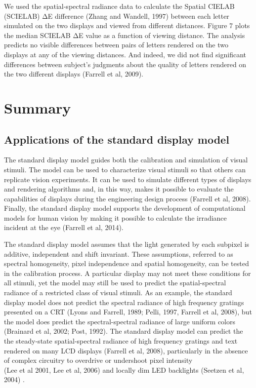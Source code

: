 \documentclass[
  letterpaper,
]{book}
\begin{document}
We used the spatial-spectral radiance data to calculate the Spatial
CIELAB (SCIELAB) ΔE difference (Zhang and Wandell, 1997) between each
letter simulated on the two displays and viewed from different
distances. Figure 7 plots the median SCIELAB ΔE value as a function of
viewing distance. The analysis predicts no visible differences between
pairs of letters rendered on the two displays at any of the viewing
distances. And indeed, we did not find significant differences between
subject's judgments about the quality of letters rendered on the two
different displays (Farrell et al, 2009).

\section{Summary}\label{summary}

\subsection{Applications of the standard display
model}\label{applications-of-the-standard-display-model}

The standard display model guides both the calibration and simulation of
visual stimuli. The model can be used to characterize visual stimuli so
that others can replicate vision experiments. It can be used to simulate
different types of displays and rendering algorithms and, in this way,
makes it possible to evaluate the capabilities of displays during the
engineering design process (Farrell et al, 2008). Finally, the standard
display model supports the development of computational models for human
vision by making it possible to calculate the irradiance incident at the
eye (Farrell et al, 2014).

The standard display model assumes that the light generated by each
subpixel is additive, independent and shift invariant. These
assumptions, referred to as spectral homogeneity, pixel independence and
spatial homogeneity, can be tested in the calibration process. A
particular display may not meet these conditions for all stimuli, yet
the model may still be used to predict the spatial-spectral radiance of
a restricted class of visual stimuli. As an example, the standard
display model does not predict the spectral radiance of high frequency
gratings presented on a CRT (Lyons and Farrell, 1989; Pelli, 1997,
Farrell et al, 2008), but the model does predict the spectral-spectral
radiance of large uniform colors (Brainard et al, 2002; Post, 1992). The
standard display model can predict the the steady-state spatial-spectral
radiance of high frequency gratings and text rendered on many LCD
displays (Farrell et al, 2008), particularly in the absence of complex
circuitry to overdrive or undershoot pixel intensity\\
(Lee et al 2001, Lee et al, 2006) and locally dim LED backlights
(Seetzen et al, 2004) .
\end{document}
